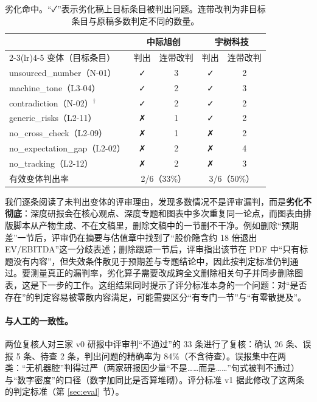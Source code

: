 \begin{table}[h]
\centering
\caption{劣化命中。“✓”表示劣化稿上目标条目被判出问题。连带改判为非目标条目与原稿多数判定不同的数量。}
\label{tab:degrade-res}
\small
\begin{tabular}{@{}l cc cc@{}}
\toprule
 & \multicolumn{2}{c}{中际旭创} & \multicolumn{2}{c}{宇树科技} \\
\cmidrule(lr){2-3}\cmidrule(lr){4-5}
变体（目标条目） & 判出 & 连带改判 & 判出 & 连带改判 \\
\midrule
unsourced\_number（N-01） & ✓ & 3 & ✓ & 2 \\
machine\_tone（L3-04） & ✓ & 2 & ✓ & 3 \\
contradiction（N-02）$^\dagger$ & ✓ & 2 & ✓ & 2 \\
generic\_risks（L2-11） & ✗ & 1 & ✓ & 2 \\
no\_cross\_check（L2-09） & ✗ & 1 & ✗ & 2 \\
no\_expectation\_gap（L2-02） & ✗ & 2 & ✗ & 4 \\
no\_tracking（L2-12） & ✗ & 2 & ✗ & 3 \\
\midrule
有效变体判出率 & \multicolumn{2}{c}{2/6（33\%）} & \multicolumn{2}{c}{3/6（50\%）} \\
\bottomrule
\end{tabular}
\par\vspace{2pt}{\footnotesize $^\dagger$ 原稿已被判出该问题，不计入判出率。}
\end{table}

我们逐条阅读了未判出变体的评审理由，发现多数情况不是评审漏判，而是\textbf{劣化不彻底}：深度研报会在核心观点、深度专题和图表中多次重复同一论点，而图表由排版脚本从产物生成、不在文稿里，删除文稿中的一节删不干净。例如删除“预期差”一节后，评审仍在摘要与估值章中找到了“股价隐含约 18 倍退出 EV/EBITDA”这一分歧表述；删除跟踪一节后，评审指出该节在 PDF 中“只有标题没有内容”，但失效条件散见于预期差与专题结论中，因此按判定标准仍判通过。要测量真正的漏判率，劣化算子需要改成跨全文删除相关句子并同步删除图表，这是下一步的工作。这组结果同时提示了评分标准本身的一个问题：对“是否存在”的判定容易被零散内容满足，可能需要区分“有专门一节”与“有零散提及”。

\paragraph{与人工的一致性。}两位复核人对三家 v0 研报中评审判“不通过”的 33 条进行了复核：确认 26 条、误报 5 条、待查 2 条，判出问题的精确率为 84\%（不含待查）。误报集中在两类：“无机器腔”判得过严（两家研报因少量“不是……而是……”句式被判不通过）与“数字密度”的口径（数字加同比是否算堆砌）。评分标准 v1 据此修改了这两条的判定标准（第 \ref{sec:eval} 节）。


